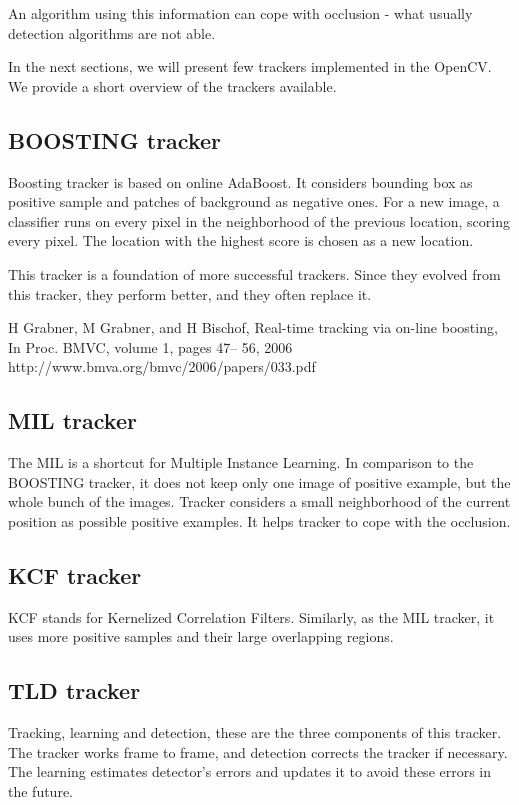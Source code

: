 An algorithm using this information can cope with occlusion - what usually
detection algorithms are not able.

In the next sections, we will present few trackers implemented in the OpenCV. We
provide a short overview of the trackers available.

\subsection*{BOOSTING tracker}
Boosting tracker is based on online AdaBoost. It considers bounding box as
positive sample and patches of background as negative ones. For a new image, a
classifier runs on every pixel in the neighborhood of the previous location,
scoring every pixel. The location with the highest score is chosen as a new
location.

This tracker is a foundation of more successful trackers. Since they evolved
from this tracker, they perform better, and they often replace it.

H Grabner, M Grabner, and H Bischof, Real-time tracking via on-line boosting, In Proc. BMVC, volume 1, pages 47– 56, 2006
http://www.bmva.org/bmvc/2006/papers/033.pdf


\subsection*{MIL tracker}
The MIL is a shortcut for Multiple Instance Learning. In comparison to the
BOOSTING tracker, it does not keep only one image of positive example, but the
whole bunch of the images. Tracker considers a small neighborhood of the
current position as possible positive examples. It helps tracker to cope with
the occlusion.

\subsection*{KCF tracker}
KCF stands for Kernelized Correlation Filters. Similarly, as the MIL tracker,
it uses more positive samples and their large overlapping regions.

\subsection*{TLD tracker}
Tracking, learning and detection, these are the three components of this
tracker. The tracker works frame to frame, and detection corrects the tracker
if necessary. The learning estimates detector's errors and updates it to avoid
these errors in the future.

